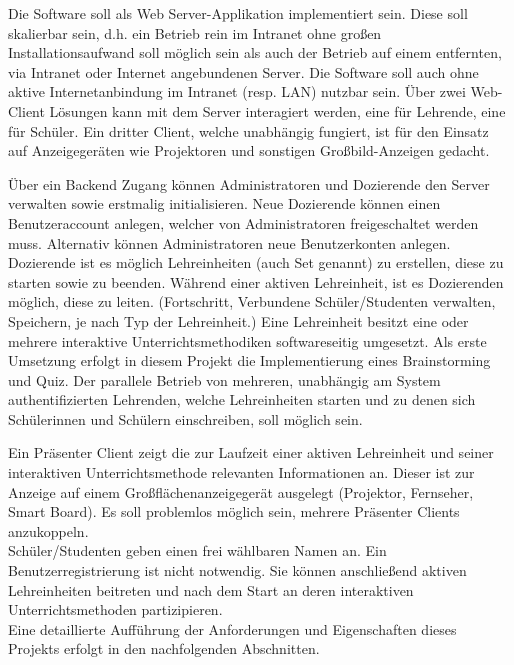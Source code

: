 Die Software soll als Web Server-Applikation implementiert sein. Diese soll skalierbar sein, d.h. ein Betrieb rein im Intranet ohne großen Installationsaufwand soll möglich sein als auch der Betrieb auf einem entfernten, via Intranet oder Internet angebundenen Server. Die Software soll auch ohne aktive Internetanbindung im Intranet (resp. LAN) nutzbar sein.
Über zwei Web-Client Lösungen kann mit dem Server interagiert werden, eine für Lehrende, eine für Schüler. Ein dritter Client, welche unabhängig fungiert, ist für den Einsatz auf Anzeigegeräten wie Projektoren und sonstigen Großbild-Anzeigen gedacht.  

Über ein Backend Zugang können Administratoren und Dozierende den Server verwalten sowie erstmalig initialisieren. Neue Dozierende können einen Benutzeraccount anlegen, welcher von Administratoren freigeschaltet werden muss. Alternativ können Administratoren neue Benutzerkonten anlegen. Dozierende ist es möglich Lehreinheiten (auch Set genannt) zu erstellen, diese zu starten sowie zu beenden. Während einer aktiven Lehreinheit, ist es Dozierenden möglich, diese zu leiten. (Fortschritt, Verbundene Schüler/Studenten verwalten, Speichern, je nach Typ der Lehreinheit.) Eine Lehreinheit besitzt eine oder mehrere interaktive Unterrichtsmethodiken softwareseitig umgesetzt. Als erste Umsetzung erfolgt in diesem Projekt die Implementierung eines Brainstorming und Quiz. Der parallele Betrieb von mehreren, unabhängig am System authentifizierten Lehrenden, welche Lehreinheiten starten und zu denen sich Schülerinnen und Schülern einschreiben, soll möglich sein.

Ein Präsenter Client zeigt die zur Laufzeit einer aktiven Lehreinheit und seiner interaktiven Unterrichtsmethode relevanten Informationen an. Dieser ist zur Anzeige auf einem Großflächenanzeigegerät ausgelegt (Projektor, Fernseher, Smart Board). Es soll problemlos möglich sein, mehrere Präsenter Clients anzukoppeln. \\ 

Schüler/Studenten geben einen frei wählbaren Namen an. Ein Benutzerregistrierung ist nicht notwendig. Sie können anschließend aktiven Lehreinheiten beitreten und nach dem Start an deren interaktiven Unterrichtsmethoden partizipieren. \\

Eine detaillierte Aufführung der Anforderungen und Eigenschaften dieses Projekts erfolgt in den nachfolgenden Abschnitten. 

